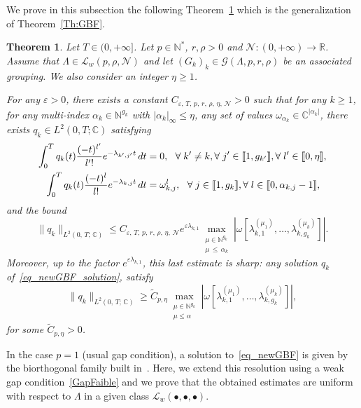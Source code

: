 \documentclass[10pt]{amsart}
\newtheorem{theo}{Theorem}[section]
\theoremstyle{definition}\newtheorem{defi}[theo]{Definition}\newtheorem{rema}[theo]{Remark}\newtheorem{exam}[theo]{Example}\newtheorem{exem}[theo]{Example}\newtheorem{nota}[theo]{Notation}
\newcommand{\llbracket}{\mathopen{[\mkern -2.7mu[}}
\newcommand{\rrbracket}{\mathclose{]\mkern -2.7mu]}}
\newcommand{\inter}[2]{\llbracket #1,#2 \rrbracket}
\newcommand{\n}{g}
\newcommand{\LL}{\mathcal{L}}
\newcommand{\NN}{\mathcal{N}}
\newcommand{\N}{\mathbb{N}}
\newcommand{\R}{\mathbb{R}}
\newcommand{\C}{\mathbb{C}}
\renewcommand{\cdot}{{\scriptstyle \bullet}}
\let\oldforall\forall
\renewcommand*{\forall}{\mathrel{\oldforall}}
\begin{document}
We prove in this subsection the following Theorem~\ref{Th:newGBF} which is the generalization of Theorem~\ref{Th:GBF}.
\begin{theo} \label{Th:newGBF}
Let $T \in (0,+\infty]$. Let $p \in \N^*$, $r, \rho > 0$ and $\NN : (0,+\infty) \to \R$. Assume that $\Lambda \in \LL_w(p,\rho, \NN)$ and let $(G_k)_k\in \mathcal{G}(\Lambda,p,r,\rho)$ be an associated grouping. We also consider an integer $\eta\geq 1$.

For any $\varepsilon > 0$, there exists a constant $C_{\varepsilon,\, T,\, p,\, r,\, \rho,\, \eta,\, \NN} >0$ such that for any $k \geq 1$, for any multi-index $\alpha_k\in \N^{\n_k}$ with $|\alpha_k|_\infty\leq \eta$, any set of values $\omega_{\alpha_k} \in \C^{|\alpha_k|}$, there exists $q_k \in L^2(0,T; \C)$ satisfying
\begin{subequations}\label{eq_newGBF}
\begin{align}
\int_0^{T} q_k(t) \frac{(-t)^{l'}}{l'!} e^{-\lambda_{k',j'}t} \, dt & = 0, \ \ \forall k'\neq k, \forall j'\in \inter{1}{\n_{k'}}, \forall l'\in \inter{0}{\eta}, \label{eq_newGBF_orthogonalite}
\\
\int_0^{T} q_k(t) \frac{(-t)^l}{l!} e^{-\lambda_{k,j}t} \, dt & = \omega_{k,j}^l, \ \ \forall j\in \inter{1}{\n_{k}}, \forall l\in \inter{0}{\alpha_{k,j}-1}, \label{eq_newGBF_solution}
\end{align}
\end{subequations}
and the bound
\begin{equation}\label{bound_qk_multiplicities}
\|q_k\|_{L^2(0,\,T;\,\C)}\leq C_{\varepsilon,\, T,\, p,\, r,\, \rho,\, \eta,\, \NN} e^{\varepsilon \lambda_{k,1}} \max\limits_{\substack{\mu\in \N^{\n_k} \\ \mu\,\leq\,\alpha_k}} \left| \omega[\lambda_{k,1}^{(\mu_1)},\dotsc,\lambda_{k,\n_k}^{(\mu_k)}] \right|.
\end{equation}
Moreover, up to the factor $e^{\varepsilon \lambda_{k,1}}$, this last estimate is sharp: any solution $q_k$ of~\eqref{eq_newGBF_solution}, satisfy
\begin{equation}\label{lower_bound_qk_multiplicities}
\|q_k\|_{L^2(0,\,T;\,\C)} \geq \widetilde{C}_{p, \eta} \max\limits_{\substack{\mu\in \N^{\n_k} \\ \mu\leq \alpha}} \left| \omega[\lambda_{k,1}^{(\mu_1)},\dotsc,\lambda_{k,\n_k}^{(\mu_k)}] \right|,
\end{equation}
for some $\widetilde{C}_{p, \eta}>0$.
\end{theo}

In the case $p=1$ (usual gap condition), a solution to~\eqref{eq_newGBF} is given by the biorthogonal family built in~\cite{AKBGBDT_Kalman}. Here, we extend this resolution using a weak gap condition~\eqref{GapFaible} and we prove that the obtained estimates are uniform with respect to $\Lambda$ in a given class $\LL_w(\cdot, \cdot, \cdot)$.
\end{document}
